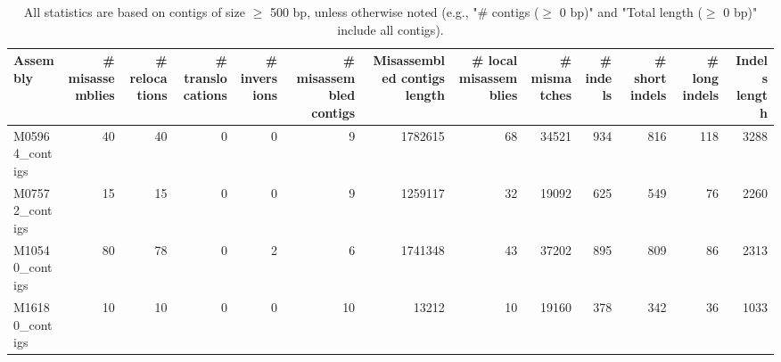 \documentclass[12pt,a4paper]{article}
\begin{document}
\begin{table}[ht]
\begin{center}
\caption{All statistics are based on contigs of size $\geq$ 500 bp, unless otherwise noted (e.g., "\# contigs ($\geq$ 0 bp)" and "Total length ($\geq$ 0 bp)" include all contigs).}
\begin{tabular}{|l*{12}{|r}|}
\hline
Assembly & \# misassemblies &     \# relocations &     \# translocations &     \# inversions & \# misassembled contigs & Misassembled contigs length & \# local misassemblies & \# mismatches & \# indels &     \# short indels &     \# long indels & Indels length \\ \hline
M05964\_contigs & 40 & 40 & 0 & 0 & 9 & 1782615 & 68 & 34521 & 934 & 816 & 118 & 3288 \\ \hline
M07572\_contigs & 15 & 15 & 0 & 0 & 9 & 1259117 & 32 & 19092 & 625 & 549 & 76 & 2260 \\ \hline
M10540\_contigs & 80 & 78 & 0 & 2 & 6 & 1741348 & 43 & 37202 & 895 & 809 & 86 & 2313 \\ \hline
M16180\_contigs & 10 & 10 & 0 & 0 & 10 & 13212 & 10 & 19160 & 378 & 342 & 36 & 1033 \\ \hline
\end{tabular}
\end{center}
\end{table}
\end{document}
